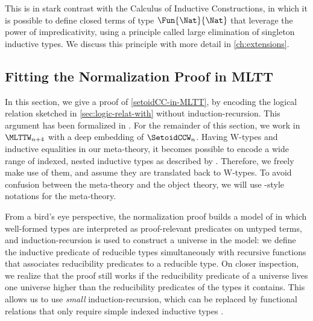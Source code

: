This is in stark contrast with the Calculus of Inductive Constructions,
in which it is possible to define closed terms of type \( \Fun{\Nat}{\Nat} \) that leverage
the power of impredicativity, using a principle called large elimination
of singleton inductive types.
%
We discuss this principle with more detail in \cref{ch:extensions}.

\subsection{Fitting the Normalization Proof in MLTT}
\label{sec:fitt-norm-proof}

In this section, we give a proof of \cref{setoidCC-in-MLTT}, by
encoding the logical relation sketched in \cref{sec:logic-relat-with}
without induction-recursion.
%
This argument has been formalized in \Agda.
%
For the remainder of this section, we work in \( \MLTTW_{n+4} \) with a deep
embedding of \( \SetoidCCW_n \).
% 
Having \( \mathrm{W} \)-types and inductive equalities in our meta-theory,
it becomes possible to encode a wide range of indexed, nested inductive
types as described by . Therefore, we freely
make use of them, and assume they are translated back to \( \mathrm{W} \)-types.
%
To avoid confusion between the meta-theory and the object theory, we
will use \Agda-style notations for the meta-theory.

From a bird's eye perspective, the normalization proof builds a model
of \SetoidCCW in which well-formed types are interpreted as proof-relevant
predicates on untyped terms, and induction-recursion is used to construct a
universe in the model: we define the inductive predicate of reducible types
simultaneously with recursive functions that associates reducibility
predicates to a reducible type.
%
On closer inspection, we realize that the proof still works if the
reducibility predicate of a universe lives one universe higher than the
reducibility predicates of the types it contains. This allows us to use
\emph{small} induction-recursion, which can be replaced by functional
relations that only require simple indexed inductive types
.

